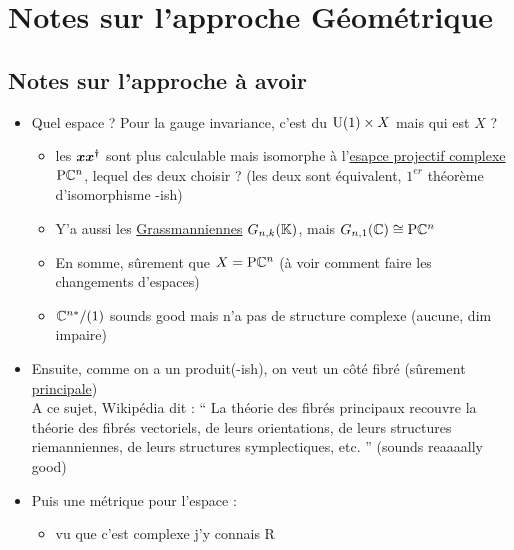 
 
\section{Notes sur l'approche Géométrique}

\subsection{Notes sur l'approche à avoir}\label{subsec:phaseG_variete}

\begin{itemize}
	\item Quel espace ? Pour la gauge invariance, c'est du $\U{1}\times X$ mais qui est $X$ ? 
	\begin{itemize}
		\item les $\bf{x}\bf{x}^\dagger$ sont plus calculable mais isomorphe à l'\href{https://en.wikipedia.org/wiki/Complex_projective_space#Differential_geometry}{esapce projectif complexe} $\PC{n}$, lequel des deux choisir ? (les deux sont équivalent, $1^{er}$ théorème d'isomorphisme -ish)
		
		\item Y'a aussi les \href{https://fr.wikipedia.org/wiki/Grassmannienne}{Grassmanniennes} $G_{n,k}(\K)$, mais $G_{n, 1}(\C)\cong \PC{n}$
		
		\item En somme, sûrement que $X=\PC{n}$ (à voir comment faire les changements d'espaces)
		
		\item $\C^{n*} / (1)$ sounds good mais n'a pas de structure complexe (aucune, dim impaire)
		
	\end{itemize}
	
	\item Ensuite, comme on a un produit(-ish), on veut un côté fibré (sûrement \href{https://fr.wikipedia.org/wiki/Fibr%C3%A9_principal}{principale}) \\
	A ce sujet, Wikipédia dit : `` La théorie des fibrés principaux recouvre la théorie des fibrés vectoriels, de leurs orientations, de leurs structures riemanniennes, de leurs structures symplectiques, etc. '' (sounds reaaaally good)
	
	\item Puis une métrique pour l'espace :
	\begin{itemize}
		
		\item vu que c'est complexe j'y connais R
		

\end{itemize}
\end{itemize}
